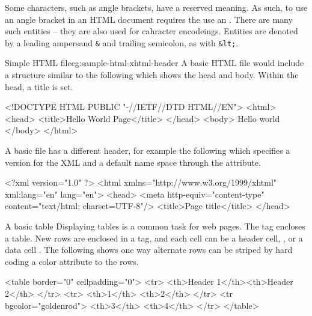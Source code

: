 Some characters, such as angle brackets, have a reserved meaning.  As
such, to use an angle bracket in an HTML document requires the use an
.  There are many such entities -- they are
also used for cahracter encodeings. Entities are
denoted by a leading ampersand \texttt{\&} and trailing semicolon, as
with \texttt{\&lt;}. 


\begin{example}{Simple HTML file}{eg:sample-html-xhtml-header}
  A basic HTML file would include a structure similar to the following
  which shows the head and body. Within the head, a title is set.
  \begin{HTMLinput}
<!DOCTYPE HTML PUBLIC "-//IETF//DTD HTML//EN">
<html>
  <head>
    <title>Hello World Page</title>
  </head>
  <body>
    Hello world
  </body>
</html>
\end{HTMLinput}

A basic  file has a different header, for example the
following which specifies a version for the XML and a default name
space through the  attribute.
\begin{HTMLinput}
<?xml version="1.0" ?>
<html xmlns="http://www.w3.org/1999/xhtml" xml:lang="en" 
  lang="en">
<head>
<meta http-equiv="content-type" 
  content="text/html; charset=UTF-8"/>
<title>Page title</title>
</head>
\end{HTMLinput}

\end{example}

\begin{example}{A basic table}{}
  Displaying tables is a common task for web pages. The 
  tag encloses a table. New rows are enclosed in a  tag,
  and each cell can be a header cell, , or a data cell
  . The following shows one way alternate rows can be
  striped by hard coding a color attribute to the rows.
  \begin{HTMLinput}
<table border="0" cellpadding="0">
  <tr>
    <th>Header 1</th><th>Header 2</th>
  </tr>
  <tr>
    <th>1</th> <th>2</th>
  </tr>
  <tr bgcolor="goldenrod">
    <th>3</th> <th>4</th>
  </tr>
</table>
 \end{HTMLinput}
\end{example}

